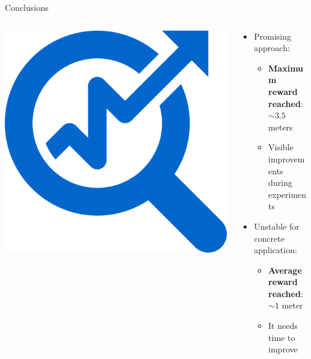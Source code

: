 \documentclass[aspectratio=169]{beamer}
\begin{document}
\begin{frame}{Conclusions}

	\begin{columns}
		\begin{column}{0.4\linewidth}
			\centering
			\includegraphics[width=0.6\linewidth]{img/conclusion.png}
		\end{column}
		\begin{column}{0.6\linewidth}
			\begin{itemize}[<+- | alert@+>]
				\item Promising approach:
				      \begin{itemize}
					      \item \textbf{Maximum reward reached}: $\sim 3.5$ meters
					      \item Visible improvements during experiments
				      \end{itemize}
				\item Unstable for concrete application:
				      \begin{itemize}
					      \item \textbf{Average reward reached}: $\sim 1$ meter
					      \item It needs time to improve
				      \end{itemize}
			\end{itemize}
		\end{column}
	\end{columns}
\end{frame}
\end{document}
